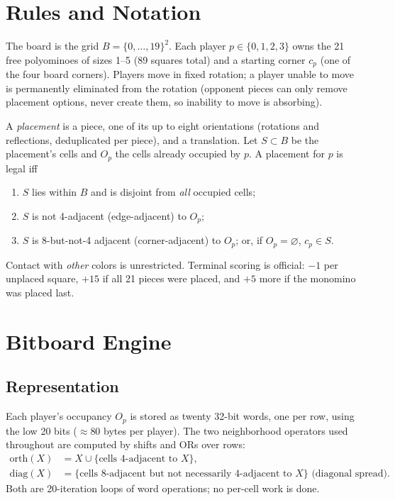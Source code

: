 \documentclass[11pt]{article}
\begin{document}
\section{Rules and Notation}
\label{sec:rules}

The board is the grid $B=\{0,\dots,19\}^2$. Each player
$p\in\{0,1,2,3\}$ owns the 21 free polyominoes of sizes 1--5 (89 squares
total) and a starting corner $c_p$ (one of the four board corners). Players
move in fixed rotation; a player unable to move is permanently eliminated
from the rotation (opponent pieces can only remove placement options, never
create them, so inability to move is absorbing).

A \emph{placement} is a piece, one of its up to eight orientations
(rotations and reflections, deduplicated per piece), and a translation. Let
$S\subset B$ be the placement's cells and $O_p$ the cells already occupied by
$p$. A placement for $p$ is legal iff
\begin{enumerate}
  \item $S$ lies within $B$ and is disjoint from \emph{all} occupied cells;
  \item $S$ is not 4-adjacent (edge-adjacent) to $O_p$;
  \item $S$ is 8-but-not-4 adjacent (corner-adjacent) to $O_p$; or, if
        $O_p=\varnothing$, $c_p\in S$.
\end{enumerate}
Contact with \emph{other} colors is unrestricted. Terminal scoring is
official: $-1$ per unplaced square, $+15$ if all 21 pieces were placed, and
$+5$ more if the monomino was placed last.

\section{Bitboard Engine}
\label{sec:engine}

\subsection{Representation}

Each player's occupancy $O_p$ is stored as twenty 32-bit words, one per row,
using the low 20 bits ($\approx$80 bytes per player). The two neighborhood
operators used throughout are computed by shifts and ORs over rows:
\begin{align*}
\mathrm{orth}(X) &= X \cup \{\text{cells 4-adjacent to } X\},\\
\mathrm{diag}(X) &= \{\text{cells 8-adjacent but not necessarily 4-adjacent to } X\}
                   \text{ (diagonal spread)}.
\end{align*}
Both are 20-iteration loops of word operations; no per-cell work is done.
\end{document}
